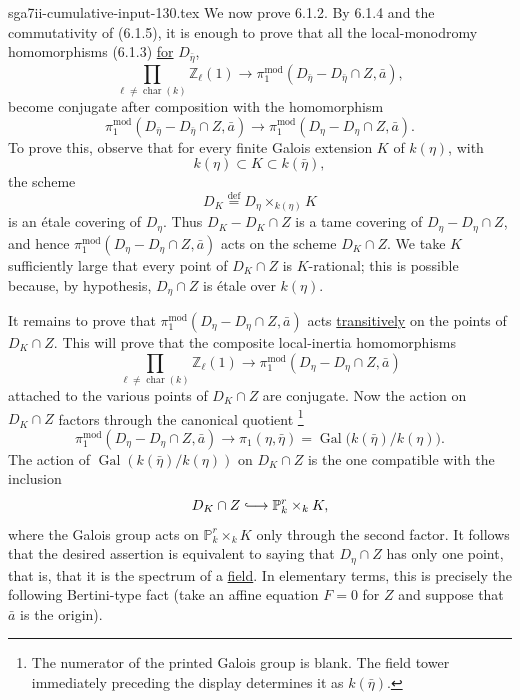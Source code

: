 \begin{filecontents*}{sga7ii-cumulative-input-130.tex}
We now prove 6.1.2.  By 6.1.4 and the commutativity of (6.1.5), it is
enough to prove that all the local-monodromy homomorphisms (6.1.3)
\underline{for} $D_{\bar\eta}$,
\begin{equation}\tag{6.1.7.1}
\prod_{\ell\ne\operatorname{char}(k)}\mathbb Z_\ell(1)
\longrightarrow
\pi_1^{\mathrm{mod}}(D_{\bar\eta}-D_{\bar\eta}\cap Z,\bar a),
\end{equation}
become conjugate after composition with the homomorphism
\begin{equation}\tag{6.1.7.2}
\pi_1^{\mathrm{mod}}(D_{\bar\eta}-D_{\bar\eta}\cap Z,\bar a)
\longrightarrow
\pi_1^{\mathrm{mod}}(D_\eta-D_\eta\cap Z,\bar a).
\end{equation}
To prove this, observe that for every finite Galois extension $K$ of
$k(\eta)$, with
\[
k(\eta)\subset K\subset k(\bar\eta),
\]
the scheme
\[
D_K\stackrel{\mathrm{def}}{=}D_\eta\times_{k(\eta)}K
\]
is an étale covering of $D_\eta$.  Thus
$D_K-D_K\cap Z$ is a tame covering of $D_\eta-D_\eta\cap Z$, and hence
$\pi_1^{\mathrm{mod}}(D_\eta-D_\eta\cap Z,\bar a)$ acts on the scheme
$D_K\cap Z$.  We take $K$ sufficiently large that every point of
$D_K\cap Z$ is $K$-rational; this is possible because, by hypothesis,
$D_\eta\cap Z$ is étale over $k(\eta)$.

It remains to prove that
$\pi_1^{\mathrm{mod}}(D_\eta-D_\eta\cap Z,\bar a)$ acts
\underline{transitively} on the points of $D_K\cap Z$.  This will prove
that the composite local-inertia homomorphisms
\[
\prod_{\ell\ne\operatorname{char}(k)}\mathbb Z_\ell(1)
\longrightarrow
\pi_1^{\mathrm{mod}}(D_\eta-D_\eta\cap Z,\bar a)
\]
attached to the various points of $D_K\cap Z$ are conjugate.  Now the
action on $D_K\cap Z$ factors through the canonical quotient
\footnote{The numerator of the printed Galois group is blank.  The field
tower immediately preceding the display determines it as $k(\bar\eta)$.}
\[
\pi_1^{\mathrm{mod}}(D_\eta-D_\eta\cap Z,\bar a)
\longrightarrow
\pi_1(\eta,\bar\eta)
=\operatorname{Gal}\bigl(k(\bar\eta)/k(\eta)\bigr).
\]
The action of $\operatorname{Gal}(k(\bar\eta)/k(\eta))$ on
$D_K\cap Z$ is the one compatible with the inclusion
\[
D_K\cap Z\lhook\joinrel\longrightarrow\mathbb P^r_k\times_k K,
\]
where the Galois group acts on $\mathbb P^r_k\times_k K$ only through
the second factor.  It follows that the desired assertion is equivalent
to saying that $D_\eta\cap Z$ has only one point, that is, that it is the
spectrum of a \underline{field}.  In elementary terms, this is precisely
the following Bertini-type fact (take an affine equation $F=0$ for $Z$
and suppose that $\bar a$ is the origin).


\end{filecontents*}
